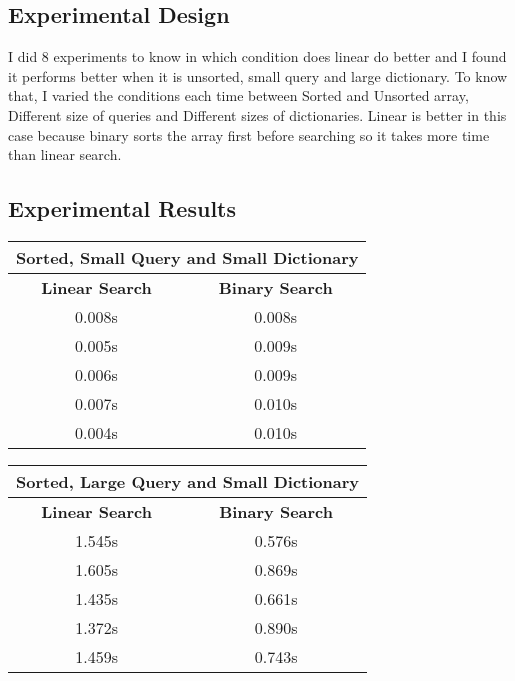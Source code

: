 \documentclass{article}
\begin{document}
\subsection{Experimental Design}
I did 8 experiments to know in which condition does linear do better and I found it performs better when it is unsorted, small query and large dictionary. To know that, I varied the conditions each time between Sorted and Unsorted array, Different size of queries and Different sizes of dictionaries. Linear is better in this case because binary sorts the array first before searching so it takes more time than linear search.
\subsection{Experimental Results}
\begin{table}[h]
\begin{tabular}{|c|c|}
\hline
\multicolumn{2}{|c|}{\textbf{Sorted, Small Query and Small Dictionary}}     \\ \hline \hline
\textbf{Linear Search} & {\textbf{Binary Search}}   \\ \hline \hline
 0.008s                 &  0.008s                \\ \hline
 0.005s                 &  0.009s               \\ \hline
 0.006s                 &  0.009s               \\ \hline
 0.007s                 &  0.010s               \\ \hline
 0.004s                 &  0.010s               \\ \hline

\end{tabular}
\end{table}
\begin{table}[h]
\begin{tabular}{|c|c|}
\hline
\multicolumn{2}{|c|}{\textbf{Sorted, Large Query and Small Dictionary}}     \\ \hline \hline
\textbf{Linear Search} & {\textbf{Binary Search}}   \\ \hline \hline
 1.545s                 &  0.576s                \\ \hline
 1.605s                 &  0.869s               \\ \hline
 1.435s                 &  0.661s               \\ \hline
 1.372s                 &  0.890s               \\ \hline
 1.459s                 &  0.743s               \\ \hline
\end{tabular}
\end{table}
\end{document}
